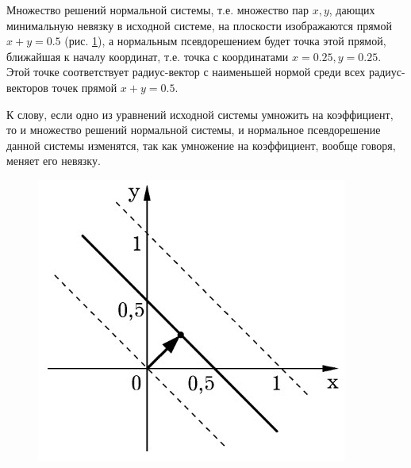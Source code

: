 \begin{example}
    Множество решений нормальной системы, т.е. множество пар $x, y$, дающих минимальную невязку в исходной системе, на плоскости изображаются прямой $x + y = 0.5$ (рис. \ref{fig:picture_16_1}), а нормальным псевдорешением будет точка этой прямой, ближайшая к началу координат, т.е. точка с координатами $x = 0.25, y = 0.25$. Этой точке соответствует радиус-вектор с наименьшей нормой среди всех радиус-векторов точек прямой $x + y = 0.5$.
    
    К слову, если одно из уравнений исходной системы умножить на коэффициент, то и множество решений нормальной системы, и нормальное псевдорешение данной системы изменятся, так как умножение на коэффициент, вообще говоря, меняет его невязку.

    \begin{figure}[H]
        \centering
        \includegraphics[scale=0.6]{images/module1/question16/1.jpg}
        \caption{}
        \label{fig:picture_16_1}
    \end{figure}

\end{example}
